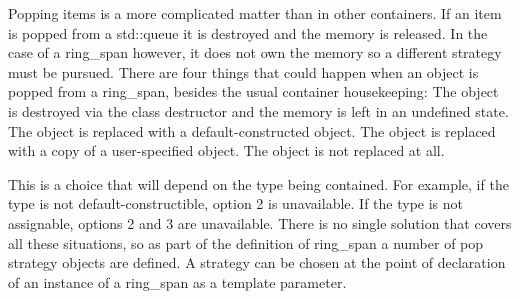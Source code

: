 Popping items is a more complicated matter than in other containers.  If an item is popped from a std::queue it is destroyed and the memory is released.  In the case of a ring_span however, it does not own the memory so a different strategy must be pursued.  There are four things that could happen when an object is popped from a ring_span, besides the usual container housekeeping:
The object is destroyed via the class destructor and the memory is left in an undefined state.
The object is replaced with a default-constructed object.
The object is replaced with a copy of a user-specified object.
The object is not replaced at all.
 
This is a choice that will depend on the type being contained.  For example, if the type is not default-constructible, option 2 is unavailable.  If the type is not assignable, options 2 and 3 are unavailable.  There is no single solution that covers all these situations, so as part of the definition of ring_span a number of pop strategy objects are defined.  A strategy can be chosen at the point of declaration of an instance of a ring_span as a template parameter.
 
